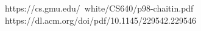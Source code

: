 \printbibliography
https://cs.gmu.edu/~white/CS640/p98-chaitin.pdf
https://dl.acm.org/doi/pdf/10.1145/229542.229546


